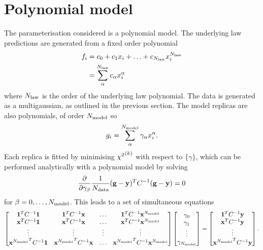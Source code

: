 \section{Polynomial model}

The parameterisation considered is a polynomial model. The underlying law
predictions are generated from a fixed order polynomial
\begin{equation}
    \begin{split}
        f_i & = c_{0} + c_{1} x_i + \ldots + c_{N_{\rm law}} x_i^{N_{\rm law}} \\
        &= \sum_{\alpha}^{N_{\rm law}} c_{\alpha} x_i^{\alpha}
    \end{split}
\end{equation}
where $N_{\rm law}$ is the order of the underlying law polynomial. The data is
generated as a multigaussian, as outlined in the previous section. The model
replicas are also polynomials, of order $N_{\rm model}$ so
\begin{equation}
    g_i = \sum_{\alpha}^{N_{\rm model}} \gamma_{\alpha} x_i^{\alpha}.
\end{equation}
Each replica is fitted by minimising ${\chi^2}^{(k)}$ with respect to $\{ \gamma \}$,
which can be performed analytically with a polynomial model by solving
\begin{equation}
    \frac{\partial}{\partial \gamma_\beta} \frac{1}{N_{\rm data}} (\mathbf{g} - \mathbf{y})^T C^{-1}_{} (\mathbf{g} - \mathbf{y}) = 0
\end{equation}
for $\beta = 0, \ldots, N_{\rm model}$. This leads to a set of simultaneous equations
\begin{equation}
    \begin{bmatrix}
        \mathbf{1}^T C^{-1}_{} \mathbf{1}  & \mathbf{1}^T C^{-1}_{} \mathbf{x} & \ldots& \mathbf{1}^T C^{-1}_{} \mathbf{x}^{N_{\rm model}} \\ 
        \mathbf{x}^T C^{-1}_{} \mathbf{1}  & \mathbf{x}^T C^{-1}_{} \mathbf{x} & \ldots& \mathbf{x}^T C^{-1}_{} \mathbf{x}^{N_{\rm model}} \\ 
        \vdots  & \vdots & \vdots& \vdots \\ 
        {\mathbf{x}^{N_{\rm model}}}^T C^{-1}_{} \mathbf{1}  & {\mathbf{x}^{N_{\rm model}}}^T C^{-1}_{} \mathbf{x} & \ldots& {\mathbf{x}^{N_{\rm model}}}^T C^{-1}_{} \mathbf{x}^{N_{\rm model}} 
    \end{bmatrix}
    \begin{bmatrix}
        \gamma_0 \\
        \gamma_1 \\
        \vdots \\
        \gamma_{N_{\rm model}}
    \end{bmatrix}
    =
    \begin{bmatrix}
        \mathbf{1}^T C^{-1}_{} \mathbf{y} \\
        \mathbf{x}^T C^{-1}_{} \mathbf{y} \\
        \vdots \\
        {\mathbf{x}^{N_{\rm model}}}^T C^{-1}_{} \mathbf{y}
    \end{bmatrix}.
\end{equation}

